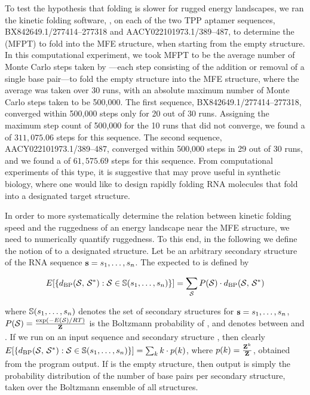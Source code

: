 To test the hypothesis that folding is slower for rugged energy landscapes,
we ran the kinetic folding software, \kinfold \citep{flamm},
on each of the two TPP \rb aptamer sequences,
BX842649.1/277414--277318 and AACY022101973.1/389--487,
to determine the \mfpt (MFPT) to
fold into the MFE structure, when starting from the empty structure.
In this computational
experiment, we took MFPT to be the average number of Monte Carlo steps
taken by \kinfold---each step consisting of the addition or removal
of a single base pair---to fold the
empty structure into the MFE
structure, where the average was taken over 30 runs, with an absolute
maximum number of Monte Carlo steps taken to be 500,000.
The first sequence, BX842649.1/277414--277318, converged within 500,000
steps only for 20 out of 30 runs. Assigning the maximum step count of
500,000 for the 10 runs that did not converge, we found a \mfpt
of $311,075.06$ steps for this sequence.
The second sequence, AACY022101973.1/389--487, converged within 500,000
steps in 29 out of 30 runs, and we found a \mfpt of
$61,575.69$ steps for this sequence. From computational experiments of this
type, it is suggestive that \fftbor may prove useful in synthetic
biology,
where one would like to design rapidly folding RNA molecules that
fold into a designated target structure.

In order to more systematically determine the relation between kinetic
folding speed and the ruggedness of an energy landscape near the MFE structure,
we need to numerically quantify ruggedness. To this end, in the following
we define the notion of \ebpd to a designated
structure. Let \strSt be an arbitrary secondary structure of the RNA sequence
${\bf s} = s_1,\dots,s_n$.
The expected \bpd to \strSt is defined by

\begin{align}
E[ \{ d_{\text{BP}}(\mathcal S,\,\mathcal S^*) : \mathcal S \in \mathbb{S}(s_1,\dots,s_n)\} ] =
\sum_{\mathcal S} P(\mathcal S) \cdot d_{\text{BP}}(\mathcal S,\,\mathcal S^*)
\end{align}

where
$\mathbb{S}(s_1,\dots,s_n)$ denotes the set of secondary structures for
${\bf s} = s_1,\dots,s_n$, $P(\mathcal S) = \frac{\exp(-E(\mathcal S)/RT)}{{\bf Z}^{}_{}}$ is the Boltzmann
probability of \str, and
\dBP{\str}{\strSt} denotes \bpd between \str and \strSt.
If we run \fftbor on an input sequence \seq and secondary structure
\strSt, then clearly
$E[ \{ d_{\text{BP}}(\mathcal S,\,\mathcal S^*) : \mathcal S \in \mathbb{S}(s_1,\dots,s_n)\} ] =
\sum_{k} k \cdot p(k)$, where $p(k)=\frac{{\bf Z}^{k}_{}}{{\bf Z}^{}_{}}$, obtained from the
program output.  If \strSt is the empty structure, then \fftbor output
is simply the probability distribution of the number of base pairs per
secondary structure, taken over the Boltzmann ensemble of all structures.

